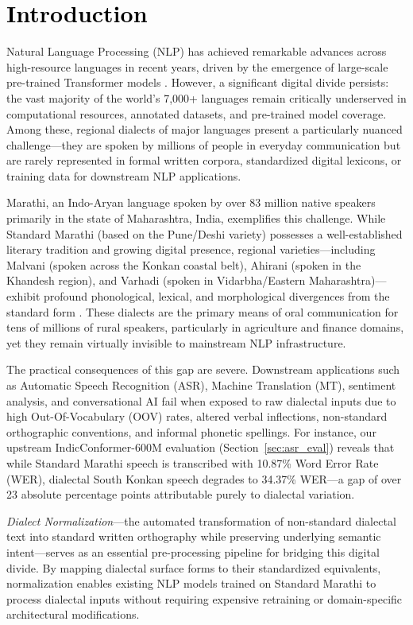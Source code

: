 \section{\textcolor{black}{Introduction}}

Natural Language Processing (NLP) has achieved remarkable advances across high-resource languages in recent years, driven by the emergence of large-scale pre-trained Transformer models \cite{vaswani2017attention,raffel2020exploring}. However, a significant digital divide persists: the vast majority of the world's 7,000+ languages remain critically underserved in computational resources, annotated datasets, and pre-trained model coverage. Among these, regional dialects of major languages present a particularly nuanced challenge---they are spoken by millions of people in everyday communication but are rarely represented in formal written corpora, standardized digital lexicons, or training data for downstream NLP applications.

Marathi, an Indo-Aryan language spoken by over 83 million native speakers primarily in the state of Maharashtra, India, exemplifies this challenge. While Standard Marathi (based on the Pune/Deshi variety) possesses a well-established literary tradition and growing digital presence, regional varieties---including Malvani (spoken across the Konkan coastal belt), Ahirani (spoken in the Khandesh region), and Varhadi (spoken in Vidarbha/Eastern Maharashtra)---exhibit profound phonological, lexical, and morphological divergences from the standard form \cite{joshi2022l3cube}. These dialects are the primary means of oral communication for tens of millions of rural speakers, particularly in agriculture and finance domains, yet they remain virtually invisible to mainstream NLP infrastructure.

The practical consequences of this gap are severe. Downstream applications such as Automatic Speech Recognition (ASR), Machine Translation (MT), sentiment analysis, and conversational AI fail when exposed to raw dialectal inputs due to high Out-Of-Vocabulary (OOV) rates, altered verbal inflections, non-standard orthographic conventions, and informal phonetic spellings. For instance, our upstream IndicConformer-600M evaluation (Section~\ref{sec:asr_eval}) reveals that while Standard Marathi speech is transcribed with 10.87\% Word Error Rate (WER), dialectal South Konkan speech degrades to 34.37\% WER---a gap of over 23 absolute percentage points attributable purely to dialectal variation.

\textit{Dialect Normalization}---the automated transformation of non-standard dialectal text into standard written orthography while preserving underlying semantic intent---serves as an essential pre-processing pipeline for bridging this digital divide. By mapping dialectal surface forms to their standardized equivalents, normalization enables existing NLP models trained on Standard Marathi to process dialectal inputs without requiring expensive retraining or domain-specific architectural modifications.

